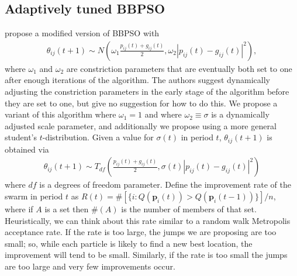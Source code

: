 \documentclass[12pt]{article}
\begin{document}
\subsection{Adaptively tuned BBPSO}\label{subsec:ATBBPSO}
\citet{hsieh2010modified} propose a modified version of BBPSO with 
\begin{align*}
\theta_{ij}(t+1) \sim N\left(\omega_1\frac{p_{ij}(t) + g_{ij}(t)}{2}, \omega_2|p_{ij}(t) - g_{ij}(t)|^2\right),
\end{align*}
where $\omega_1$ and $\omega_2$ are constriction parameters that are eventually both set to one after enough iterations of the algorithm. The authors suggest dynamically adjusting the constriction parameters in the early stage of the algorithm before they are set to one, but give no suggestion for how to do this. We propose a variant of this algorithm where $\omega_1=1$ and where $\omega_2\equiv\sigma$ is a dynamically adjusted scale parameter, and additionally we propose using a more general student's $t$-distribution. Given a value for $\sigma(t)$ in period $t$, $\theta_{ij}(t+1)$ is obtained via
\begin{align}\label{eq:at-bbpso}
\theta_{ij}(t+1) \sim T_{df}\left(\frac{p_{ij}(t) + g_{ij}(t)}{2}, \sigma(t)|p_{ij}(t) - g_{ij}(t)|^2\right)
\end{align}
where $df$ is a degrees of freedom parameter. Define the improvement rate of the swarm in period $t$ as $R(t) = \#[\{i:Q(\bm{p}_i(t))> Q(\bm{p}_i(t-1))\}]/n$, where if $A$ is a set then $\#(A)$ is the number of members of that set. Heuristically, we can think about this rate similar to a random walk Metropolis acceptance rate. If the rate is too large, the jumps we are proposing are too small; so, while each particle is likely to find a new best location, the improvement will tend to be small. Similarly, if the rate is too small the jumps are too large and very few improvements occur. 

\end{document}
